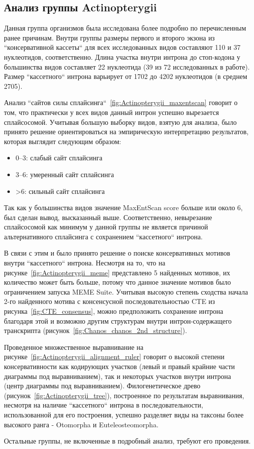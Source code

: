 \subsection{Анализ группы Actinopterygii}

Данная группа организмов была исследована более подробно по перечисленным ранее причинам.
Внутри группы размеры первого и второго экзона из ``консервативной кассеты`` для всех исследованных видов составляют 110 и 37 нуклеотидов, соответственно.
Длина участка внутри интрона до стоп-кодона у большинства видов составляет 22 нуклеотида (39 из 72 исследованных в работе).
Размер ``кассетного`` интрона варьирует от 1702 до 4202 нуклеотидов (в среднем 2705).

Анализ ``сайтов силы сплайсинга``~\ref{fig:Actinopterygii_maxentscan} говорит о том, что практически у всех видов данный интрон успешно вырезается сплайсосомой.
Учитывая большую выборку видов, взятую для анализа, было принято решение ориентироваться на эмпирическую интерпретацию результатов, которая выглядит следующим образом:

\begin{spacing}{0.5}
\begin{itemize}
    \item 0–3: слабый сайт сплайсинга
    \item 3–6: умеренный сайт сплайсинга
    \item >6: сильный сайт сплайсинга
\end{itemize}
\end{spacing}

Так как у большинства видов значение MaxEntScan score больше или около 6, был сделан вывод, высказанный выше.
Соответственно, невырезание сплайсосомой как минимум у данной группы не является причиной альтернативного сплайсинга с сохранением ``кассетного`` интрона.

В связи с этим и было принято решение о поиске консервативных мотивов внутри ``кассетного`` интрона.
Несмотря на то, что на рисунке~\ref{fig:Actinopterygii_meme} представлено 5 найденных мотивов, их количество может быть больше, потому что данное значение мотивов было ограничением запуска MEME Suite.
Учитывая высокую степень сходства начала 2-го найденного мотива с консенсусной последовательностью CTE из рисунка~\ref{fig:CTE_consensus}, можно предположить сохранение интрона благодаря этой и возможно другим структурам внутри интрон-содержащего транскрипта (рисунок~\ref{fig:Chanos_chanos_2nd_structure}).

Проведенное множественное выравнивание на рисунке~\ref{fig:Actinopterygii_alignment_ruler} говорит о высокой степени консервативности как кодирующих участков (левый и правый крайние части диаграммы под выравниванием), так и некоторых участков внутри интрона (центр диаграммы под выравниванием).
Филогенетическое древо (рисунок~\ref{fig:Actinopterygii_tree}), построенное по результатам выравнивания, несмотря на наличие ``кассетного`` интрона в последовательности, использованной для его построения, успешно разделяет виды на таксоны более высокого ранга - Otomorpha и Euteleosteomorpha.

Остальные группы, не включенные в подробный анализ, требуют его проведения.